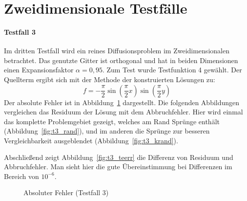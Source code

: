 \section{Zweidimensionale Testfälle}

\paragraph{Testfall 3}

\noindent
Im dritten Testfall wird ein reines Diffusionsproblem im Zweidimensionalen
betrachtet. Das genutzte Gitter ist orthogonal und hat in beiden Dimensionen
einen Expansionsfaktor $\alpha=0,95$. Zum Test wurde Testfunktion 4
gewählt. Der Quellterm ergibt sich mit der Methode der konstruierten Lösungen zu:
\begin{equation}
  f=-\frac{\pi}{2} \sin\left(\frac{\pi}{2} x\right) \sin\left(\frac{\pi}{2} y\right)
\end{equation}
Der absolute Fehler ist in Abbildung~\ref{fig:t3_abs} dargestellt.
Die folgenden Abbildungen vergleichen das Residuum der Lösung mit dem
Abbruchfehler. Hier wird einmal das komplette Problemgebiet gezeigt, welches
am Rand Sprünge enthält (Abbildung~\ref{fig:t3_rand}), und im anderen die
Sprünge zur besseren Vergleichbarkeit ausgeblendet (Abbildung~\ref{fig:t3_krand}).

Abschließend zeigt Abbildung~\ref{fig:t3_teerr} die Differenz von Residuum und
Abbruchfehler. Man sieht hier die gute Übereinstimmung bei Differenzen
im Bereich von $10^{-6}$.

\begin{figure}[h]
\centering
\begin{subfigure}[b]{.5\linewidth}
\centering
{}
\end{subfigure}%
\begin{subfigure}[b]{.5\linewidth}
\centering
{}
\end{subfigure}
\caption{Absoluter Fehler (Testfall 3)}
\label{fig:t3_abs}
\end{figure}


